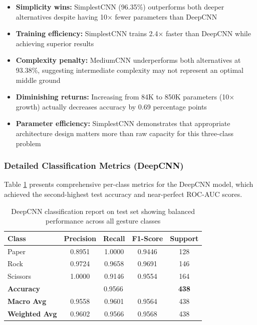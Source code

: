 \documentclass[12pt,a4paper]{article}
\begin{document}
\begin{itemize}
    \item \textbf{Simplicity wins:} SimplestCNN (96.35\%) outperforms both deeper alternatives despite having 10× fewer parameters than DeepCNN
    \item \textbf{Training efficiency:} SimplestCNN trains 2.4× faster than DeepCNN while achieving superior results
    \item \textbf{Complexity penalty:} MediumCNN underperforms both alternatives at 93.38\%, suggesting intermediate complexity may not represent an optimal middle ground
    \item \textbf{Diminishing returns:} Increasing from 84K to 850K parameters (10× growth) actually decreases accuracy by 0.69 percentage points
    \item \textbf{Parameter efficiency:} SimplestCNN demonstrates that appropriate architecture design matters more than raw capacity for this three-class problem
\end{itemize}

\subsubsection{Detailed Classification Metrics (DeepCNN)}

Table \ref{tab:deepcnn_detailed} presents comprehensive per-class metrics for the DeepCNN model, which achieved the second-highest test accuracy and near-perfect ROC-AUC scores.

\begin{table}[H]
\centering
\begin{tabular}{lcccc}
\toprule
\textbf{Class} & \textbf{Precision} & \textbf{Recall} & \textbf{F1-Score} & \textbf{Support} \\
\midrule
Paper & 0.8951 & 1.0000 & 0.9446 & 128 \\
Rock & 0.9724 & 0.9658 & 0.9691 & 146 \\
Scissors & 1.0000 & 0.9146 & 0.9554 & 164 \\
\midrule
\textbf{Accuracy} & \multicolumn{3}{c}{0.9566} & \textbf{438} \\
\textbf{Macro Avg} & 0.9558 & 0.9601 & 0.9564 & 438 \\
\textbf{Weighted Avg} & 0.9602 & 0.9566 & 0.9568 & 438 \\
\bottomrule
\end{tabular}
\caption{DeepCNN classification report on test set showing balanced performance across all gesture classes}
\label{tab:deepcnn_detailed}
\end{table}
\end{document}

